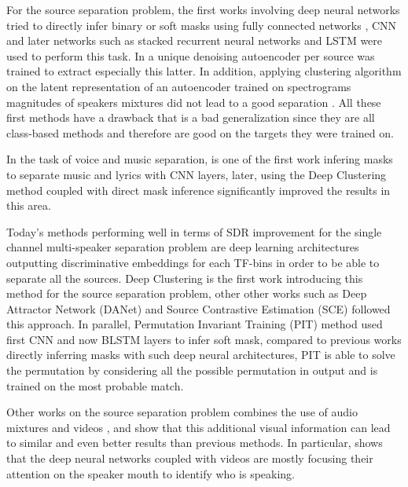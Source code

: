 \documentclass[master, tikz, final,11pt, dvipdfmx]{iscs-thesis}
\begin{document}
For the source separation problem, the first works involving deep neural networks tried to directly infer binary or soft masks using fully connected networks \cite{DNNSS, MASKDNN, MasksDNN, MASKDNN2}, CNN \cite{CNNrecog, Karaoke} and later networks such as stacked recurrent neural networks \cite{RNNSS, DNNSS2} and LSTM \cite{OverviewSSDL,LSTMSS, SpeechEnh} were used to perform this task. In \cite{AESS, AESS2} a unique  denoising autoencoder per source was trained to extract especially this latter. In addition, applying clustering algorithm on the latent representation of an autoencoder trained on spectrograms magnitudes of speakers mixtures did not lead to a good separation \cite{AESSsimple}. All these first methods have a drawback that is a bad generalization since they are all class-based  methods and therefore are good on the targets they were trained on. 

In the task of voice and music separation, \cite{Karaoke} is one of the first work infering masks to separate music and lyrics with CNN layers, later, \cite{chimera} using the Deep Clustering method coupled with direct mask inference significantly improved the results in this area.

Today's methods performing well in terms of SDR improvement for the single channel multi-speaker separation problem are deep learning architectures outputting discriminative embeddings for each TF-bins in order to be able to separate all the sources. Deep Clustering \cite{DPCLV1} is the first work introducing this method for the source separation problem, other other works such as Deep Attractor Network (DANet) \cite{DANet} and Source Contrastive Estimation (SCE) \cite{SCE} followed this approach. In parallel, Permutation Invariant Training (PIT) \cite{PIT, PIT1, PIT_recog} method used first CNN and now BLSTM layers to infer soft mask, compared to previous works directly inferring masks with such deep neural architectures, PIT is able to solve the permutation by considering all the possible permutation in output and is trained on the most probable match. 

Other works on the source separation problem  combines the use of audio mixtures and videos \cite{DAVSE, ImageSS, SpeechEnh}, and show that this additional visual information can lead to similar and even better results than previous methods. In particular, \cite{ImageSS} shows that the deep neural networks coupled with videos are mostly focusing their attention on the speaker mouth to identify who is speaking.
\end{document}
